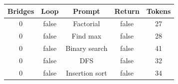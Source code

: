 \begin{table}[h]
\centering
\begin{tabular}{ |c|c|c|c|c| }
\hline
Bridges & Loop & Prompt & Return & Tokens \\
\hline
0 & false & Factorial & false & 27 \\
\hline
0 & false & Find max & false & 28 \\
\hline
0 & false & Binary search & false & 41 \\
\hline
0 & false & DFS & false & 32 \\
\hline
0 & false & Insertion sort & false & 34 \\
\hline
\end{tabular}
\end{table}
